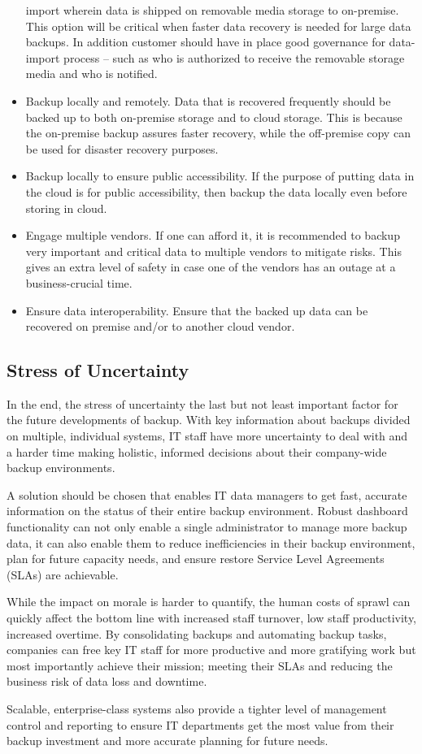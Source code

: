 \begin{itemize}
		import wherein data is shipped on removable media storage to
		on-premise. This option will be critical when faster data
		recovery is needed for large data backups. In addition customer
		should have in place good governance for data-import process --
		such as who is authorized to receive the removable storage media
		and who is notified.
	\item Backup locally and remotely. Data that is recovered frequently
		should be backed up to both on-premise storage and to cloud
		storage. This is because the on-premise backup assures faster
		recovery, while the off-premise copy can be used for disaster
		recovery purposes.
	\item Backup locally to ensure public accessibility. If the purpose
		of putting data in the cloud is for public accessibility, then
		backup the data locally even before storing in cloud.
	\item Engage multiple vendors. If one can afford it, it is
		recommended to backup very important and critical data to
		multiple vendors to mitigate risks. This gives an extra level of
		safety in case one of the vendors has an outage at a
		business-crucial time.
	\item Ensure data interoperability. Ensure that the backed up data
		can be recovered on premise and/or to another cloud vendor.
\end{itemize}


\subsection{Stress of Uncertainty}

In the end, the stress of uncertainty the last but not least important
factor for the future developments of backup. With key information about
backups divided on multiple, individual systems, IT staff have more
uncertainty to deal with and a harder time making holistic, informed
decisions about their company-wide backup environments.

A solution should be chosen that enables IT data managers to get fast,
accurate information on the status of their entire backup environment.
Robust dashboard functionality can not only enable a single
administrator to manage more backup data, it can also enable them to
reduce inefficiencies in their backup environment, plan for future
capacity needs, and ensure restore Service Level Agreements (SLAs) are
achievable. 

While the impact on morale is harder to quantify, the human costs of
sprawl can quickly affect the bottom line with increased staff turnover,
low staff productivity, increased overtime. By consolidating backups and
automating backup tasks, companies can free key IT staff for more
productive and more gratifying work but most importantly achieve their
mission; meeting their SLAs and reducing the business risk of data loss
and downtime.

Scalable, enterprise-class systems also provide a tighter level of
management control and reporting to ensure IT departments get the most
value from their backup investment and more accurate planning for future
needs.
